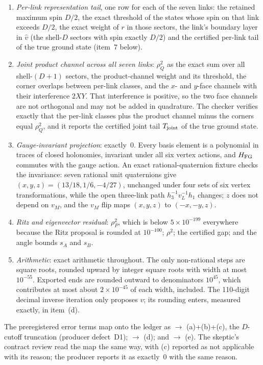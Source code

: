 \begin{enumerate}[label=(\alph*)]
\item \emph{Per-link representation tail}, one row for each of the seven
 links: the retained maximum spin $D/2$, the exact threshold of the states
 whose spin on that link exceeds $D/2$, the exact weight of $r$ in those
 sectors, the link's boundary layer in $\hat v$ (the shell-$D$ sectors with
 spin exactly $D/2$) and the certified per-link tail of the true ground state
 (item~7 below).
\item \emph{Joint product channel across all seven links}: $\rho_Q^2$ as the
 exact sum over all shell-$(D+1)$ sectors, the product-channel weight and its
 threshold, the corner overlaps between per-link classes, and the $x$- and
 $y$-face channels with their interference $2XY$. That interference is
 positive, so the two face channels are not orthogonal and may not be added
 in quadrature. The checker verifies exactly that the per-link classes plus
 the product channel minus the corners equal $\rho_Q^2$, and it reports the
 certified joint tail $T_{\rm joint}$ of the true ground state.
\item \emph{Gauge-invariant projection}: exactly~0. Every basis element is a
 polynomial in traces of closed holonomies, invariant under all six vertex
 actions, and $H_{\rm FG}$ commutes with the gauge action. An exact
 rational-quaternion fixture checks the invariance: seven rational unit
 quaternions give $(x,y,z)=(13/18,1/6,-4/27)$, unchanged under four sets of
 six vertex transformations, while the open three-link path
 $h_3^{-1}v_L^{-1}h_1$ changes; $z$ does not depend on $v_M$, and the $v_M$
 flip maps $(x,y,z)$ to $(-x,-y,z)$.
\item \emph{Ritz and eigenvector residual}: $\rho_P^2$, which is below
 $5\times10^{-199}$ everywhere because the Ritz proposal is rounded at
 $10^{-100}$; $\rho^2$; the certified gap; and the angle bounds $s_A$ and
 $s_B$.
\item \emph{Arithmetic}: exact  arithmetic throughout.
 The only non-rational steps are square roots, rounded upward by integer
 square roots with width at most $10^{-55}$. Exported ends are rounded
 outward to denominators $10^{45}$, which contributes at most about
 $2\times10^{-45}$ of each width, included. The 110-digit decimal inverse
 iteration only proposes $v$; its rounding enters, measured exactly, in
 item~(d).
\end{enumerate}
The preregistered error terms map onto the ledger as 
$\to$ (a)+(b)+(c), the $D$-cutoff truncation (producer defect~D1);
 $\to$ (d); and  $\to$ (e). The
skeptic's contract review read the map the same way, with (c) reported as
not applicable with its reason; the producer reports it as exactly~0 with
the same reason.

